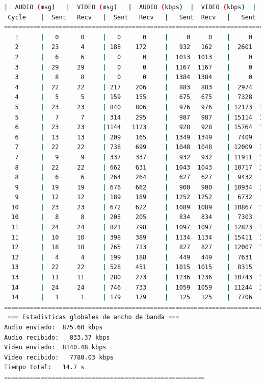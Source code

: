 \begin{lstlisting}[language=bash,basicstyle=\ttfamily\scriptsize]
          |  AUDIO (msg)   |  VIDEO (msg)   |  AUDIO (kbps)  |  VIDEO (kbps)  |   CPU (%)
 Cycle    |  Sent   Recv   |  Sent   Recv   |   Sent  Recv   |   Sent  Recv   | Program System
============================================================================================
   1      |   0      0     |   0      0     |     0     0    |     0     0    |   0      0
   2      |  23      4     | 188    172     |   932   162    |  2601   2383   |  40     62
   2      |   6      6     |   0      0     |  1013  1013    |     0      0   |  36     65
   3      |  29     29     |   0      0     |  1167  1167    |     0      0   |  55     79
   3      |   8      8     |   0      0     |  1384  1384    |     0      0   |  47     79
   4      |  22     22     | 217    206     |   883   883    |  2974   2819   |  37     77
   4      |   5      5     | 159    155     |   675   675    |  7328   7154   |  20     77
   5      |  23     23     | 840    806     |   976   976    | 12173  11676   |  33     74
   5      |   7      7     | 314    295     |   987   987    | 15114  14209   |  34     72
   6      |  23     23     |1144   1123     |   928   928    | 15764  15475   |  40     72
   6      |  13     13     | 209    165     |  1349  1349    |  7409   5848   |  60     73
   7      |  22     22     | 738    699     |  1048  1048    | 12009  11377   |  52     73
   7      |   9      9     | 337    337     |   932   932    | 11911  11911   |  50     75
   8      |  22     22     | 662    631     |  1043  1043    | 10717  10218   |  44     76
   8      |   6      6     | 264    264     |   627   627    |  9432   9423   |  44     76
   9      |  19     19     | 676    662     |   900   900    | 10934  10707   |  31     76
   9      |  12     12     | 189    189     |  1252  1252    |  6732   6732   |  50     76
  10      |  23     23     | 672    622     |  1089  1089    | 10867  10058   |  33     74
  10      |   8      8     | 205    205     |   834   834    |  7303   7295   |  38     72
  11      |  24     24     | 821    798     |  1097  1097    | 12823  12467   |  33     73
  11      |  10     10     | 398    389     |  1134  1134    | 15411  15062   |  31     75
  12      |  18     18     | 765    713     |   827   827    | 12007  11190   |  37     71
  12      |   4      4     | 199    188     |   449   449    |  7631   7208   |  30     70
  13      |  22     22     | 528    451     |  1015  1015    |  8315   7104   |  43     74
  13      |  11     11     | 280    273     |  1236  1236    | 10743  10474   |  44     74
  14      |  24     24     | 746    733     |  1059  1059    | 11244  11048   |  36     77
  14      |   1      1     | 179    179     |   125   125    |  7706   7696   |  19     77
============================================================================================
 === Estadisticas globales de ancho de banda ===
Audio enviado:	875.60 kbps
Audio recibido:   833.37 kbps
Video enviado:	8140.48 kbps
Video recibido:   7780.03 kbps
Tiempo total: 	14.7 s
=======================================================


\end{lstlisting}
